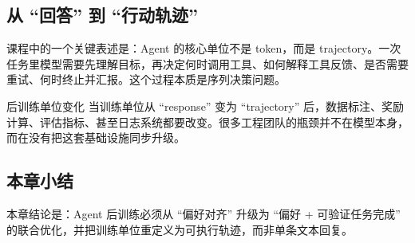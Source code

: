 \subsection{从 ``回答'' 到 ``行动轨迹''}
课程中的一个关键表述是：Agent 的核心单位不是 token，而是 trajectory。一次任务里模型需要先理解目标，再决定何时调用工具、如何解释工具反馈、是否需要重试、何时终止并汇报。这个过程本质是序列决策问题。

\begin{importantbox}{后训练单位变化}
当训练单位从 ``response'' 变为 ``trajectory'' 后，数据标注、奖励计算、评估指标、甚至日志系统都要改变。很多工程团队的瓶颈并不在模型本身，而在没有把这套基础设施同步升级。
\end{importantbox}

\subsection{本章小结}
本章结论是：Agent 后训练必须从 ``偏好对齐'' 升级为 ``偏好 + 可验证任务完成'' 的联合优化，并把训练单位重定义为可执行轨迹，而非单条文本回复。

